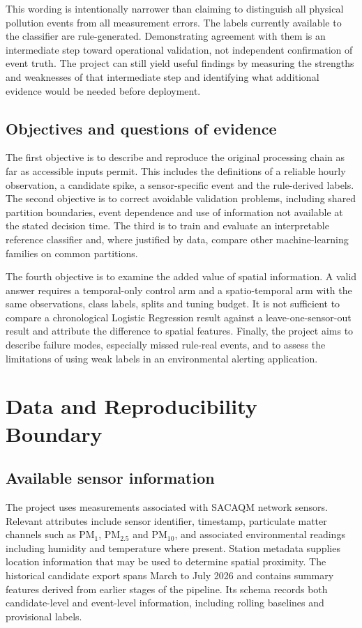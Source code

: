 \documentclass[12pt,a4paper,oneside]{report}
\newcommand{\pmf}{PM$_{2.5}$}
\begin{document}
This wording is intentionally narrower than claiming to distinguish all physical pollution events from all measurement errors. The labels currently available to the classifier are rule-generated. Demonstrating agreement with them is an intermediate step toward operational validation, not independent confirmation of event truth. The project can still yield useful findings by measuring the strengths and weaknesses of that intermediate step and identifying what additional evidence would be needed before deployment.

\section{Objectives and questions of evidence}
The first objective is to describe and reproduce the original processing chain as far as accessible inputs permit. This includes the definitions of a reliable hourly observation, a candidate spike, a sensor-specific event and the rule-derived labels. The second objective is to correct avoidable validation problems, including shared partition boundaries, event dependence and use of information not available at the stated decision time. The third is to train and evaluate an interpretable reference classifier and, where justified by data, compare other machine-learning families on common partitions.

The fourth objective is to examine the added value of spatial information. A valid answer requires a temporal-only control arm and a spatio-temporal arm with the same observations, class labels, splits and tuning budget. It is not sufficient to compare a chronological Logistic Regression result against a leave-one-sensor-out result and attribute the difference to spatial features. Finally, the project aims to describe failure modes, especially missed rule-real events, and to assess the limitations of using weak labels in an environmental alerting application.

\chapter{Data and Reproducibility Boundary}
\section{Available sensor information}
The project uses measurements associated with SACAQM network sensors. Relevant attributes include sensor identifier, timestamp, particulate matter channels such as PM$_1$, \pmf{} and PM$_{10}$, and associated environmental readings including humidity and temperature where present. Station metadata supplies location information that may be used to determine spatial proximity. The historical candidate export spans March to July 2026 and contains summary features derived from earlier stages of the pipeline. Its schema records both candidate-level and event-level information, including rolling baselines and provisional labels.
\end{document}
